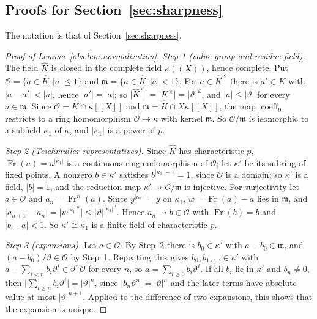 \documentclass[11pt]{amsart}
\theoremstyle{definition}
\theoremstyle{remark}
\numberwithin{equation}{section}
\newcommand{\Z}{\mathbb Z}
\newcommand{\abs}[1]{\lvert #1\rvert}
\newcommand{\coeff}{\operatorname{coeff}}
\newcommand{\Kh}{\widehat K}
\theoremstyle{plain}
\theoremstyle{definition}
\theoremstyle{plain}
\begin{document}
\subsection{Proofs for Section~\ref{sec:sharpness}}\label{dfr:ssec:sharpness}

The notation is that of Section~\ref{sec:sharpness}.

\begin{proof}[Proof of Lemma~\ref{obs:lem:normalization}]
\emph{Step 1 (value group and residue field).} The field $\Kh$ is closed in the complete field $\kappa((X))$, hence
complete. Put $\mathcal O=\{a\in\Kh:\abs a\le1\}$ and $\mathfrak m=\{a\in\Kh:\abs a<1\}$. For $a\in\Kh^\times$ there is
$a'\in K$ with $\abs{a-a'}<\abs a$, hence $\abs{a'}=\abs a$; so $\abs{\Kh^\times}=\abs{K^\times}=\abs\vartheta^\Z$, and
$\abs a\le\abs\vartheta$ for every $a\in\mathfrak m$. Since $\mathcal O=\Kh\cap\kappa[[X]]$ and
$\mathfrak m=\Kh\cap X\kappa[[X]]$, the map $\coeff_0$ restricts to a ring homomorphism $\mathcal O\to\kappa$ with kernel
$\mathfrak m$. So $\mathcal O/\mathfrak m$ is isomorphic to a subfield $\kappa_1$ of $\kappa$, and $\abs{\kappa_1}$ is a
power of $p$.

\emph{Step 2 (Teichm\"uller representatives).} Since $\Kh$ has characteristic $p$,
$\operatorname{Fr}(a)=a^{\abs{\kappa_1}}$ is a continuous ring endomorphism of $\mathcal O$; let $\kappa'$ be its subring
of fixed points. A nonzero $b\in\kappa'$ satisfies $b^{\abs{\kappa_1}-1}=1$, since $\mathcal O$ is a domain; so $\kappa'$
is a field, $\abs b=1$, and the reduction map $\kappa'\to\mathcal O/\mathfrak m$ is injective. For surjectivity let
$a\in\mathcal O$ and $a_n=\operatorname{Fr}^n(a)$. Since $y^{\abs{\kappa_1}}=y$ on $\kappa_1$, $w=\operatorname{Fr}(a)-a$
lies in $\mathfrak m$, and $\abs{a_{n+1}-a_n}=\abs{w^{\abs{\kappa_1}^n}}\le\abs\vartheta^{\abs{\kappa_1}^n}$. Hence
$a_n\to b\in\mathcal O$ with $\operatorname{Fr}(b)=b$ and $\abs{b-a}<1$. So $\kappa'\cong\kappa_1$ is a finite field of
characteristic $p$.

\emph{Step 3 (expansions).} Let $a\in\mathcal O$. By Step~2 there is $b_0\in\kappa'$ with $a-b_0\in\mathfrak m$, and
$(a-b_0)/\vartheta\in\mathcal O$ by Step~1. Repeating this gives $b_0,b_1,\ldots\in\kappa'$ with
$a-\sum_{i<n}b_i\vartheta^i\in\vartheta^n\mathcal O$ for every $n$, so $a=\sum_{i\ge0}b_i\vartheta^i$. If all $b_i$ lie
in $\kappa'$ and $b_n\ne0$, then $\abs{\sum_{i\ge n}b_i\vartheta^i}=\abs\vartheta^n$, since $\abs{b_n\vartheta^n}=
\abs\vartheta^n$ and the later terms have absolute value at most $\abs\vartheta^{n+1}$. Applied to the difference of two
expansions, this shows that the expansion is unique.


\end{proof}
\end{document}
